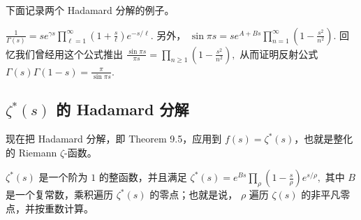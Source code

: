 
下面记录两个 Hadamard 分解的例子。

\begin{example}
	\(\textstyle \frac{1}{\Gamma(s)} =\allowbreak{} se^{\gamma s} \prod_{\ell=\allowbreak{}1}^{\infty} \left(1+\allowbreak{}\frac{s}{\ell}\right)e^{-s/\ell}.\)
	另外，
	\(\textstyle \sin \pi s =\allowbreak{} se^{A+\allowbreak{}Bs} \prod_{n=\allowbreak{}1}^{\infty}\left(1-\frac{s^2}{n^2}\right).\)
	回忆我们曾经用这个公式推出
	\(\textstyle \frac{\sin \pi s}{\pi s} =\allowbreak{} \prod_{n\geq\allowbreak{} 1}\left(1-\frac{s^2}{n^2}\right),\allowbreak{}\)
	从而证明反射公式
	\(\textstyle \Gamma(s)\Gamma(1-s)=\allowbreak{}\frac{\pi}{\sin \pi s}.\)
\end{example}

\subsection{\texorpdfstring{\(\zeta^*(s)\) 的 Hadamard 分解}{zeta*(s) 的 Hadamard 分解}}

现在把 Hadamard 分解，即 Theorem 9.5，应用到
$f(s)=\zeta^*(s)$，也就是整化的 Riemann $\zeta$-函数。

\begin{theorem}
	$\zeta^*(s)$ 是一个阶为 $1$ 的整函数，并且满足
	\(\textstyle \zeta^*(s) =\allowbreak{} e^{Bs}\prod_\rho \left(1-\frac{s}{\rho}\right)e^{s/\rho},\allowbreak{}\)
		其中 $B$ 是一个复常数，乘积遍历 $\zeta^*(s)$ 的零点；也就是说，
		$\rho$ 遍历 $\zeta(s)$ 的非平凡零点，并按重数计算。
\end{theorem}

